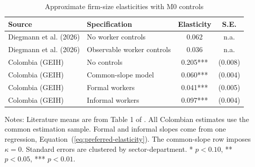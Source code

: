 \begin{table}[htbp]
  \centering
  \caption{Approximate firm-size elasticities with M0 controls}
  \label{tab:preferred-elasticities}
  \small
  \begin{tabular}{p{}p{}cc}
    \toprule
    Source & Specification & Elasticity & S.E. \\
    \midrule
    Diegmann et al. (2026) & No worker controls & 0.062 & n.a. \\
    Diegmann et al. (2026) & Observable worker controls & 0.036 & n.a. \\
    \midrule
    Colombia (GEIH) & No controls & 0.205*** & (0.008) \\
    Colombia (GEIH) & Common-slope model & 0.060*** & (0.004) \\
    Colombia (GEIH) & Formal workers & 0.041*** & (0.005) \\
    Colombia (GEIH) & Informal workers & 0.097*** & (0.004) \\
    \bottomrule
  \end{tabular}
  \vspace{0.3em}
  \begin{minipage}{0.95\textwidth}
  \footnotesize
  Notes: Literature means are from Table 1 of \citet{DiegmannMullerSchoefer2026}. All Colombian estimates use the common estimation sample. Formal and informal slopes come from one regression, Equation~(\ref{eq:preferred-elasticity}). The common-slope row imposes $\kappa=0$. Standard errors are clustered by sector-department. * $p<0.10$, ** $p<0.05$, *** $p<0.01$.
  \end{minipage}
\end{table}
